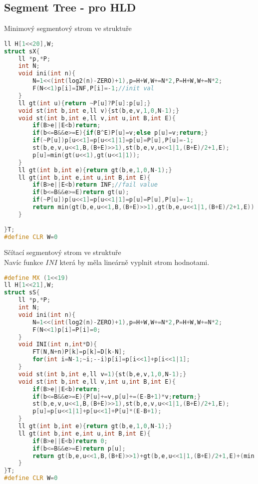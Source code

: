 \documentclass[11pt]{article}
\begin{document}
\subsection{Segment Tree - pro HLD}
Minimový segmentový strom ve struktuře
\begin{lstlisting}[language=C++]
ll H[1<<20],W;
struct sX{
    ll *p,*P;
    int N;
    void ini(int n){
        N=1<<(int(log2(n)-ZERO)+1),p=H+W,W+=N*2,P=H+W,W+=N*2;
        F(N<<1)p[i]=INF,P[i]=-1;//init val
    }
    ll gt(int u){return ~P[u]?P[u]:p[u];}
    void st(int b,int e,ll v){st(b,e,v,1,0,N-1);}
    void st(int b,int e,ll v,int u,int B,int E){
        if(B>e||E<b)return;
        if(b<=B&&e>=E){if(B^E)P[u]=v;else p[u]=v;return;}
        if(~P[u])p[u<<1]=p[u<<1|1]=p[u]=P[u],P[u]=-1;
        st(b,e,v,u<<1,B,(B+E)>>1),st(b,e,v,u<<1|1,(B+E)/2+1,E);
        p[u]=min(gt(u<<1),gt(u<<1|1));
    }
    ll gt(int b,int e){return gt(b,e,1,0,N-1);}
    ll gt(int b,int e,int u,int B,int E){
        if(B>e||E<b)return INF;//fail value
        if(b<=B&&e>=E)return gt(u);
        if(~P[u])p[u<<1]=p[u<<1|1]=p[u]=P[u],P[u]=-1;
        return min(gt(b,e,u<<1,B,(B+E)>>1),gt(b,e,u<<1|1,(B+E)/2+1,E));
    }
    
}T;
#define CLR W=0
\end{lstlisting}
Sčítací segmentový strom ve struktuře
\\Navíc funkce $INI$ která by měla lineárně vyplnit strom hodnotami.
\begin{lstlisting}[language=C++]
#define MX (1<<19)
ll H[1<<21],W;
struct sS{
    ll *p,*P;
    int N;
    void ini(int n){
        N=1<<(int(log2(n)-ZERO)+1),p=H+W,W+=N*2,P=H+W,W+=N*2;
        F(N<<1)p[i]=P[i]=0;
    }
    void INI(int n,int*D){
        FT(N,N+n)P[k]=p[k]=D[k-N];
        for(int i=N-1;~i;--i)p[i]=p[i<<1]+p[i<<1|1];
    }
    void st(int b,int e,ll v=1){st(b,e,v,1,0,N-1);}
    void st(int b,int e,ll v,int u,int B,int E){
        if(B>e||E<b)return;
        if(b<=B&&e>=E){P[u]+=v,p[u]+=(E-B+1)*v;return;}
        st(b,e,v,u<<1,B,(B+E)>>1),st(b,e,v,u<<1|1,(B+E)/2+1,E);
        p[u]=p[u<<1|1]+p[u<<1]+P[u]*(E-B+1);
    }
    ll gt(int b,int e){return gt(b,e,1,0,N-1);}
    ll gt(int b,int e,int u,int B,int E){
        if(B>e||E<b)return 0;
        if(b<=B&&e>=E)return p[u];
        return gt(b,e,u<<1,B,(B+E)>>1)+gt(b,e,u<<1|1,(B+E)/2+1,E)+(min(e,E)-max(b,B)+1)*P[u];
    }
}T;
#define CLR W=0
\end{lstlisting}
\end{document}
